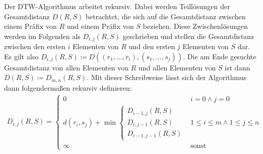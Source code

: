 \documentclass{whswinvcbook}
\begin{document}
Der DTW-Algorithmus arbeitet rekursiv. Dabei werden Teillösungen der Gesamtdistanz $D(R,S)$ betrachtet, die sich auf die Gesamtdistanz zwischen einem Präfix von $R$ und einem Präfix von $S$ beziehen. Diese Zwischenlösungen werden im Folgenden als $D_{i,j}(R,S)$ geschrieben und stellen die Gesamtdistanz zwischen den ersten $i$ Elementen von $R$ und den ersten $j$ Elementen von $S$ dar. Es gilt also $D_{i,j}(R,S)\coloneqq D((r_1,\dots,r_i),(s_1,\dots,s_j))$. Die am Ende gesuchte Gesamtdistanz von allen Elementen von $R$ und allen Elementen von $S$ ist dann $D(R,S)\coloneqq D_{m,n}(R,S)$. Mit dieser Schreibweise lässt sich der Algorithmus dann folgendermaßen rekursiv definieren:
\begin{align}\label{eq-dtw-cases}
    D_{i,j}(R,S)=\begin{cases}
        0&i=0\land j=0\\
        d(r_i,s_j)+\min\begin{cases}
            D_{i-1,j}(R,S)\\
            D_{i,j-1}(R,S)\\
            D_{i-1,j-1}(R,S)
        \end{cases}&1\leq i\leq m\land1\leq j\leq n\\
        \infty&\text{sonst}
    \end{cases}
\end{align}
\end{document}
